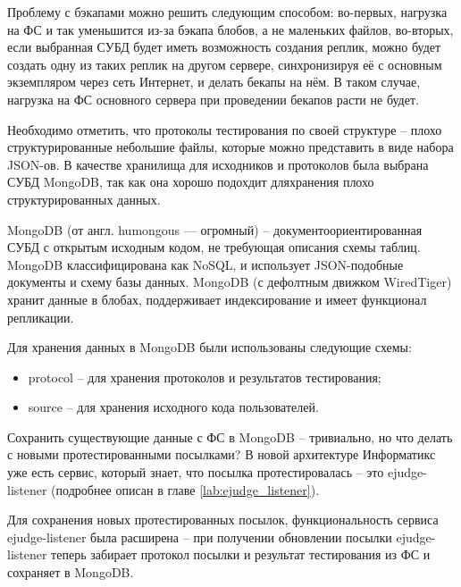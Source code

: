 Проблему с бэкапами можно решить следующим способом:
во-первых, нагрузка на ФС и так уменьшится из-за бэкапа блобов, а не маленьких файлов, 
во-вторых, если выбранная СУБД будет иметь возможность создания реплик, 
можно будет создать одну из таких реплик на другом сервере, синхронизируя её с основным экземпляром через сеть Интернет, и делать бекапы на нём. 
В таком случае, нагрузка на ФС основного сервера при проведении бекапов расти не будет.

Необходимо отметить, что протоколы тестирования по своей структуре -- 
плохо структурированные небольшие файлы, которые можно представить в виде набора JSON-ов.
В качестве хранилища для исходников и протоколов была выбрана СУБД MongoDB, так как она хорошо подохдит дляхранения плохо структурированных данных\cite{mongo_good_for_unstruct}.

MongoDB (от англ. humongous — огромный) -- документоориентированная СУБД с открытым исходным кодом, не требующая описания схемы таблиц. 
MongoDB классифицирована как NoSQL, и использует JSON-подобные документы и схему базы данных. 
MongoDB (с дефолтным движком WiredTiger\cite{mongo_store_engine}) хранит данные в блобах\cite{mongo_wiredtiger}, поддерживает индексирование и имеет функционал репликации\cite{mongo_indexes}\cite{mongo_replicas}.

Для хранения данных в MongoDB были использованы следующие схемы:

\begin{itemize}
    \item protocol -- для хранения протоколов и результатов тестирования;
    \item source -- для хранения исходного кода пользователей.
\end{itemize}

Сохранить существующие данные с ФС в MongoDB -- тривиально,
но что делать с новыми протестированными посылками?
В новой архитектуре Информатикс уже есть сервис, 
который знает, что посылка протестировалась -- это ejudge-listener (подробнее описан в главе \ref{lab:ejudge_listener}).

Для сохранения новых протестированных посылок, 
функциональность сервиса ejudge-listener была расширена 
-- при получении обновлении посылки ejudge-listener теперь забирает протокол посылки и результат тестирования из ФС и сохраняет в MongoDB.

